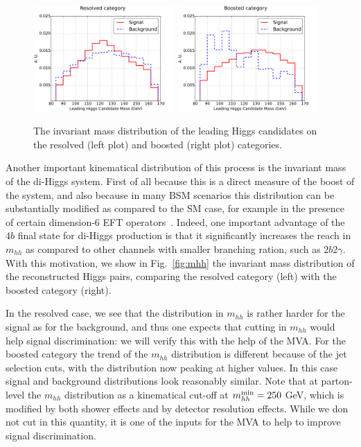 \begin{figure}[t]
\begin{center}
  \includegraphics[width=0.48\textwidth]{plots/m_H0_res_C1.pdf}
  \includegraphics[width=0.48\textwidth]{plots/m_H0_boost_C1.pdf}
  \caption{\small The invariant mass distribution of the leading
    Higgs candidates on the resolved (left plot) and boosted (right
    plot) categories. 
}
\label{fig:mHHinv}
\end{center}
\end{figure}


Another important kinematical distribution of this process is the invariant mass
of the di-Higgs system.
%
First of all because this is a direct measure of the boost of the system,
and also because in many BSM scenarios this distribution can be substantially
modified as compared to the SM case, for example in the presence
of certain dimension-6 EFT operators~\cite{Azatov:2015oxa}.
%
Indeed, one important advantage of the $4b$ final state for
di-Higgs production is that it significantly increases the reach
in $m_{hh}$ as compared to other channels with smaller branching
ration,
such as $2b2\gamma$.
%
With this motivation, we show in
Fig.~\ref{fig:mhh} the invariant mass distribution of the
reconstructed Higgs pairs,
comparing the resolved category (left) with the boosted category (right).


In the resolved case, we see that the distribution
in $m_{hh}$ is rather harder for the signal as for the background,
and thus one expects that cutting in $m_{hh}$ would help signal
discrimination: we will verify this with the help of the MVA.
%
For the boosted category the trend of the $m_{hh}$ distribution
is different because of the jet selection cuts, with the
distribution now peaking at higher values.
%
In this case signal and background distributions
look reasonably similar.
%
Note that at parton-level the $m_{hh}$ distribution as a kinematical
cut-off at $m_{hh}^{\rm min}=250$ GeV, which is modified by both
shower effects and by detector resolution effects.
%
While we don not cut in this quantity, it is
one of the inputs for the MVA to help to improve signal discrimination.

